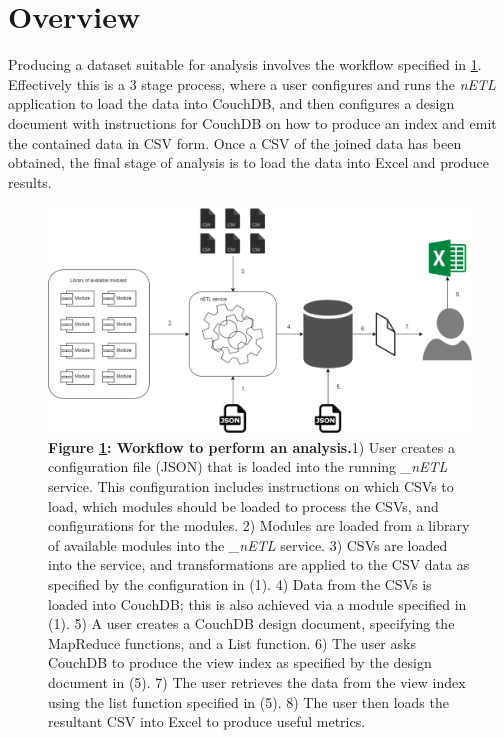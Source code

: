 \section{Overview}
Producing a dataset suitable for analysis involves the workflow specified in \ref{analysis-workflow}. Effectively this is a 3 stage process, where a user configures and runs the \textit{nETL} application to load the data into CouchDB, and then configures a design document with instructions for CouchDB on how to produce an index and emit the contained data in CSV form. Once a CSV of the joined data has been obtained, the final stage of analysis is to load the data into Excel and produce results.

\begin{figure}[ht]
    \centering
    \begin{mdframed}
        \centering
        \includegraphics[scale=0.35]{./resources/figures/analysis-workflow.png}
    \end{mdframed}
    \caption[Analysis Workflow]{\textbf{Figure \ref{analysis-workflow}: Workflow to perform an analysis.}1) User creates a configuration file (JSON) that is loaded into the running \textit{\_nETL} service. This configuration includes instructions on which CSVs to load, which modules should be loaded to process the CSVs, and configurations for the modules. 2) Modules are loaded from a library of available modules into the \textit{\_nETL} service. 3) CSVs are loaded into the service, and transformations are applied to the CSV data as specified by the configuration in (1). 4) Data from the CSVs is loaded into CouchDB; this is also achieved via a module specified in (1). 5) A user creates a CouchDB design document, specifying the MapReduce functions, and a List function. 6) The user asks CouchDB to produce the view index as specified by the design document in (5). 7) The user retrieves the data from the view index using the list function specified in (5). 8) The user then loads the resultant CSV into Excel to produce useful metrics.}
    \label{analysis-workflow}
\end{figure}

